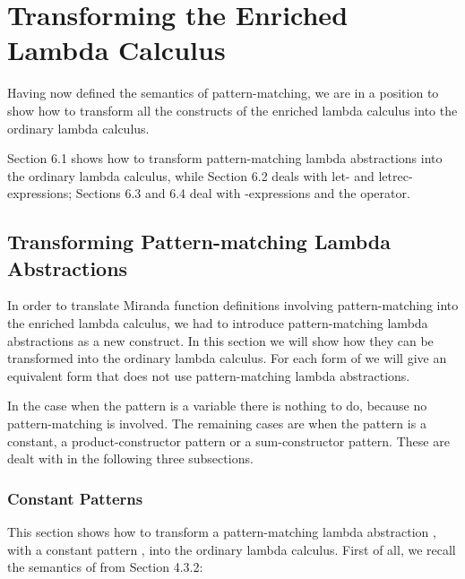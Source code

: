 \chapter[Transforming the Enriched Lambda Calculus][Transforming the Enriched Lambda Calculus]{Transforming the Enriched\\Lambda Calculus}
\vspace{3cm}

Having now defined the semantics of pattern-matching, we are in a position to
show how to transform all the constructs of the enriched lambda calculus into
the ordinary lambda calculus.

Section 6.1 shows how to transform pattern-matching lambda abstractions
into the ordinary lambda calculus, while Section 6.2 deals with let- and
letrec-expressions; Sections 6.3 and 6.4 deal with -expressions and the \fatbar{}
operator.

\section{Transforming Pattern-matching Lambda Abstractions}

In order to translate Miranda function definitions involving pattern-matching
into the enriched lambda calculus, we had to introduce pattern-matching
lambda abstractions as a new construct. In this section we will show how they
can be transformed into the ordinary lambda calculus. For each form of 
we will give an equivalent form that does not use pattern-matching lambda
abstractions.

In the case when the pattern  is a variable there is nothing to do, because
no pattern-matching is involved. The remaining cases are when the pattern is
a constant, a product-constructor pattern or a sum-constructor pattern. These
are dealt with in the following three subsections.

\subsection{Constant Patterns}

This section shows how to transform a pattern-matching lambda abstraction
, with a constant pattern , into the ordinary lambda calculus. First of
all, we recall the semantics of  from Section 4.3.2:

